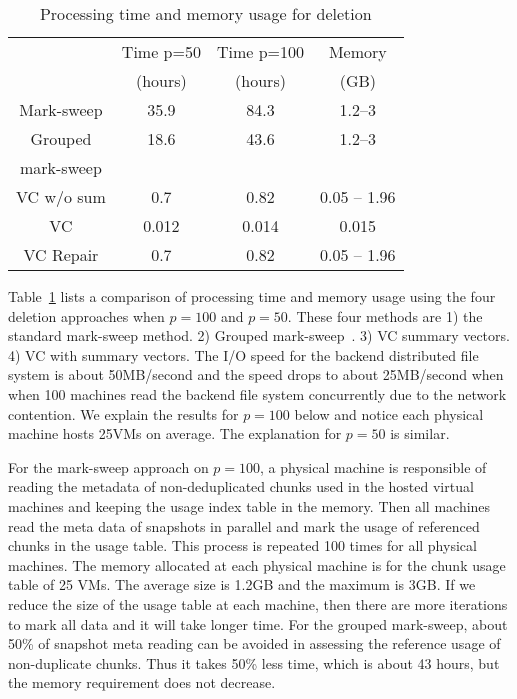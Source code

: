 

\begin{table}[htb]
\centering
\begin{tabular}{|c|c|c|c|}
    \hline 
	    &Time p=50 & Time p=100 & Memory \\
	    &(hours)  & (hours) & (GB) \\
\hline
Mark-sweep  & 35.9  &  84.3  & 1.2--3 \\
\hline
Grouped &     18.6    & 43.6   & 1.2--3 \\
mark-sweep &        &    &  \\
\hline
VC w/o sum &  0.7     & 0.82   & 0.05 -- 1.96 \\
\hline
VC  &  0.012      & 0.014   & 0.015  \\
\hline
VC Repair  &  0.7      & 0.82   & 0.05 -- 1.96 \\
\hline
    \end{tabular}
    \caption{ Processing time and memory usage  for
deletion}  
    \label{tab:deletion-cmp}
\end{table}

Table~\ref{tab:deletion-cmp}   lists a comparison of processing time and memory usage
using the four deletion approaches when $p=100$ and $p=50$. These four 
methods are 1) the standard mark-sweep method. 2) Grouped mark-sweep~\cite{Guo2011}. 
3)   VC summary vectors. 4) VC with summary vectors.
The I/O speed for the backend distributed file system is about 50MB/second
and the speed drops to about 25MB/second when
when 100 machines read the backend file system concurrently due to the network
contention. We explain the results for $p=100$ below and notice each physical machine hosts 25VMs on average. The explanation for $p=50$ is similar.

For the mark-sweep approach on $p=100$, a physical machine is responsible of 
reading the metadata of non-deduplicated chunks used in the hosted 
virtual machines and keeping the usage index table in the memory.
Then all machines read the meta data 
of snapshots in parallel and mark the usage of referenced chunks
in the usage table.
This process is repeated 100 times for all physical machines.
The memory allocated at each physical machine is for the 
chunk usage table of 25 VMs. The average size is 1.2GB and the maximum is
3GB. If we reduce the size of  the usage table at each machine, 
then there are more iterations to mark all data and it 
will take longer time.    
For the grouped mark-sweep, about 50\% of snapshot meta reading can be 
avoided in assessing the reference usage of non-duplicate chunks. 
Thus it takes 50\% less time, which is about 43 hours, but the 
memory requirement does not decrease.


